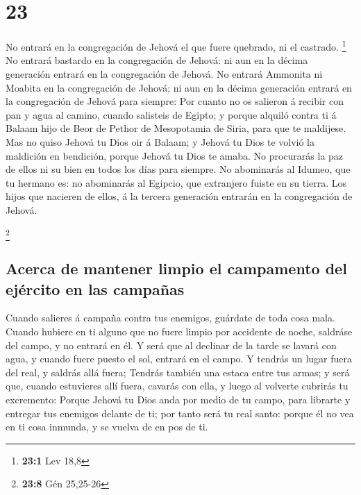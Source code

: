 \hypertarget{section-22}{%
\section{23}\label{section-22}}

 No entrará en la congregación de Jehová el que fuere
quebrado, ni el castrado. \footnote{\textbf{23:1} Lev 18,8}
 No entrará bastardo en la congregación de Jehová: ni aun
en la décima generación entrará en la congregación de Jehová.
 No entrará Ammonita ni Moabita en la congregación de
Jehová; ni aun en la décima generación entrará en la congregación de
Jehová para siempre:  Por cuanto no os salieron á recibir
con pan y agua al camino, cuando salisteis de Egipto; y porque alquiló
contra ti á Balaam hijo de Beor de Pethor de Mesopotamia de Siria, para
que te maldijese.  Mas no quiso Jehová tu Dios oir á
Balaam; y Jehová tu Dios te volvió la maldición en bendición, porque
Jehová tu Dios te amaba.  No procurarás la paz de ellos ni
su bien en todos los días para siempre.  No abominarás al
Idumeo, que tu hermano es: no abominarás al Egipcio, que extranjero
fuiste en su tierra.  Los hijos que nacieren de ellos, á
la tercera generación entrarán en la congregación de Jehová.

\footnote{\textbf{23:8} Gén 25,25-26}

\hypertarget{acerca-de-mantener-limpio-el-campamento-del-ejuxe9rcito-en-las-campauxf1as}{%
\subsection{Acerca de mantener limpio el campamento del ejército en las
campañas}\label{acerca-de-mantener-limpio-el-campamento-del-ejuxe9rcito-en-las-campauxf1as}}

 Cuando salieres á campaña contra tus enemigos, guárdate
de toda cosa mala.  Cuando hubiere en ti alguno que no
fuere limpio por accidente de noche, saldráse del campo, y no entrará en
él.  Y será que al declinar de la tarde se lavará con
agua, y cuando fuere puesto el sol, entrará en el campo. 
Y tendrás un lugar fuera del real, y saldrás allá fuera; 
Tendrás también una estaca entre tus armas; y será que, cuando
estuvieres allí fuera, cavarás con ella, y luego al volverte cubrirás tu
excremento:  Porque Jehová tu Dios anda por medio de tu
campo, para librarte y entregar tus enemigos delante de ti; por tanto
será tu real santo: porque él no vea en ti cosa inmunda, y se vuelva de
en pos de ti.

